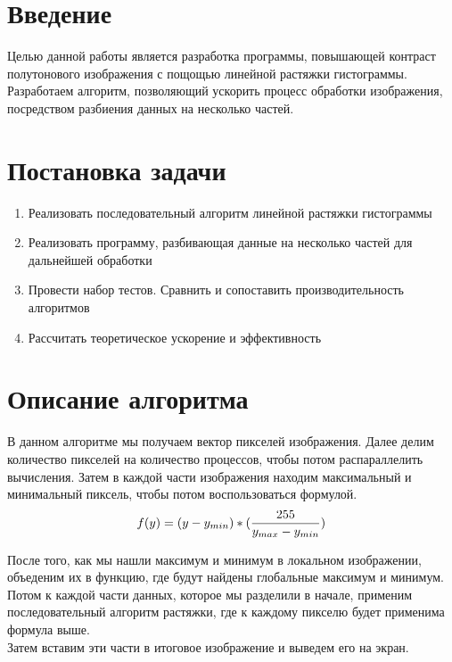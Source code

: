 \documentclass{report}
\begin{document}
\setcounter{page}{2}

\tableofcontents
\newpage

\section*{Введение}
Целью данной работы является разработка программы, 
повышающей контраст полутонового изображения с пощощью линейной растяжки гистограммы. Разработаем алгоритм, позволяющий ускорить процесс обработки изображения, посредством разбиения данных на несколько частей.
\newpage

\section*{Постановка задачи}
\begin{enumerate} 
    \item Реализовать последовательный алгоритм линейной растяжки гистограммы
    \item Реализовать программу, разбивающая данные на несколько частей для дальнейшей обработки
    \item Провести набор тестов. Сравнить и сопоставить производительность алгоритмов
    \item Рассчитать теоретическое ускорение и эффективность
\end{enumerate}
\newpage

\section*{Описание алгоритма}
В данном алгоритме мы получаем вектор пикселей изображения. Далее делим количество пикселей на количество процессов, чтобы потом распараллелить вычисления. Затем в каждой части изображения находим максимальный и минимальный пиксель, чтобы потом воспользоваться формулой.\\
$$
f(y) = (y-{y_{min}})*(\frac{255}{y_{max}-y_{min}}) \\
$$

После того, как мы нашли максимум и минимум в локальном изображении, объеденим их в функцию, где будут найдены глобальные максимум и минимум. \\
Потом к каждой части данных, которое мы разделили в начале, применим последовательный алгоритм растяжки, где к каждому пикселю будет применима формула выше. \\
Затем вставим эти части в итоговое изображение и выведем его на экран.
\newpage
\end{document}
